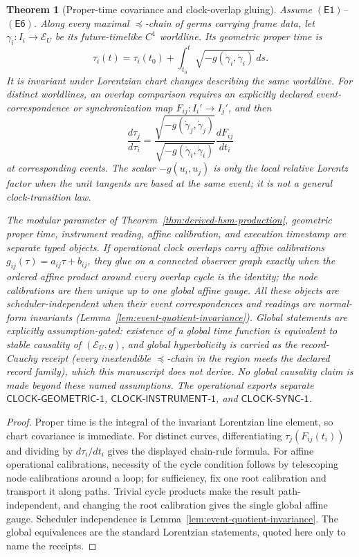 \documentclass[11pt]{article}
\newtheorem{theorem}{Theorem}[section]
\begin{document}
\begin{theorem}[Proper-time covariance and clock-overlap gluing]
\label{thm:clock-gluing}
Assume \(\mathsf{(E1)}\)--\(\mathsf{(E6)}\). Along every maximal
\(\preceq\)-chain of germs carrying frame data, let
\(\gamma_i:I_i\to\mathcal E_U\) be its future-timelike \(C^1\) worldline.
Its geometric proper time is
\[
\tau_i(t)=\tau_i(t_0)+\int_{t_0}^{t}
\sqrt{-g(\dot\gamma_i,\dot\gamma_i)}\,ds.
\]
It is invariant under Lorentzian chart changes describing the same worldline.
For distinct worldlines, an overlap comparison requires an explicitly declared event-correspondence
or synchronization map \(F_{ij}:I_i'\to I_j'\), and then
\[
\frac{d\tau_j}{d\tau_i}
=
\frac{\sqrt{-g(\dot\gamma_j,\dot\gamma_j)}}
     {\sqrt{-g(\dot\gamma_i,\dot\gamma_i)}}
\frac{dF_{ij}}{dt_i}
\]
at corresponding events.  The scalar \(-g(u_i,u_j)\) is only the local relative Lorentz factor
when the unit tangents are based at the same event; it is not a general clock-transition law.

The modular parameter of Theorem~\ref{thm:derived-hsm-production}, geometric proper time,
instrument reading, affine calibration, and execution timestamp are separate typed objects.  If
operational clock overlaps carry affine calibrations \(g_{ij}(\tau)=a_{ij}\tau+b_{ij}\), they glue
on a connected observer graph exactly when the ordered affine product around every overlap cycle
is the identity; the node calibrations are then unique up to one global affine gauge.  All these
objects are scheduler-independent when their event correspondences and readings are normal-form
invariants (Lemma~\ref{lem:event-quotient-invariance}). Global statements are explicitly
assumption-gated: existence of a global time function is equivalent to stable
causality of \((\mathcal E_U,g)\), and global hyperbolicity is carried as the
\emph{record-Cauchy receipt} (every inextendible \(\preceq\)-chain in the
region meets the declared record family), which this manuscript does not
derive. No global causality claim is made beyond these named assumptions.
The operational exports separate
\(\mathsf{CLOCK\text{-}GEOMETRIC\text{-}1}\),
\(\mathsf{CLOCK\text{-}INSTRUMENT\text{-}1}\), and
\(\mathsf{CLOCK\text{-}SYNC\text{-}1}\).
\end{theorem}

\begin{proof}
Proper time is the integral of the invariant Lorentzian line element, so chart covariance is
immediate.  For distinct curves, differentiating \(\tau_j(F_{ij}(t_i))\) and dividing by
\(d\tau_i/dt_i\) gives the displayed chain-rule formula.  For affine operational calibrations,
necessity of the cycle condition follows by telescoping node calibrations around a loop; for
sufficiency, fix one root calibration and transport it along paths.  Trivial cycle products make
the result path-independent, and changing the root calibration gives the single global affine
gauge.  Scheduler independence is Lemma~\ref{lem:event-quotient-invariance}. The global
equivalences are the standard Lorentzian statements, quoted here only to name the receipts.
\end{proof}
\end{document}
